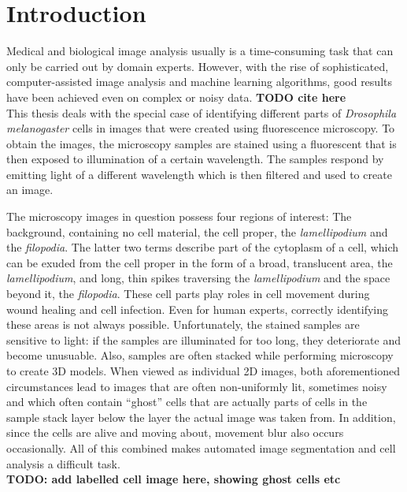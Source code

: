 \chapter{Introduction}
Medical and biological image analysis usually is a time-consuming task that can only be carried out by domain experts. However, with the rise of sophisticated, computer-assisted image analysis and machine learning algorithms, good results have been achieved even on complex or noisy data. \textbf {TODO cite here}\\

\noindent This thesis deals with the special case of identifying different parts of \textit{Drosophila melanogaster} cells in images that were created using fluorescence microscopy. To obtain the images, the microscopy samples are stained using a fluorescent that is then exposed to illumination of a certain wavelength. The samples respond by emitting light of a different wavelength which is then filtered and used to create an image.

The microscopy images in question possess four regions of interest: The background, containing no cell material, the cell proper, the \textit{lamellipodium} and the \textit{filopodia}. The latter two terms describe part of the cytoplasm of a cell, which can be exuded from the cell proper in the form of a broad, translucent area, the \textit{lamellipodium}, and long, thin spikes traversing the \textit{lamellipodium} and the space beyond it, the \textit{filopodia}. These cell parts play roles in cell movement during wound healing and cell infection. Even for human experts, correctly identifying these areas is not always possible. Unfortunately, the stained samples are sensitive to light: if the samples are illuminated for too long, they deteriorate and become unusuable. Also, samples are often stacked while performing microscopy to create 3D models. When viewed as individual 2D images, both aforementioned circumstances lead to images that are often non-uniformly lit, sometimes noisy and which often contain ``ghost'' cells that are actually parts of cells in the sample stack layer below the layer the actual image was taken from. In addition, since the cells are alive and moving about, movement blur also occurs occasionally. All of this combined makes automated image segmentation and cell analysis a difficult task.\\
\textbf{TODO: add labelled cell image here, showing ghost cells etc}\\

